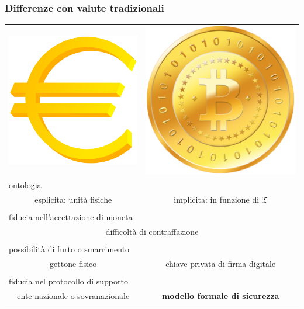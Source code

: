 \begin{frame}
	\frametitle{Differenze con valute tradizionali}
	
\begin{table}[h]
\begin{tabular}{ll}
	\multicolumn{1}{c}{\includegraphics[width = 1 cm]{images/euro.png}} &
	\multicolumn{1}{c}{\includegraphics[width = 1 cm]{images/bitcoin.png}} 											  \\
	
	\multicolumn{2}{l}{{\color{blue}ontologia}}                                                               \\
	\multicolumn{1}{c}{esplicita: unità fisiche} &
	\multicolumn{1}{c}{implicita: in funzione di $\mathfrak{T}$}															  \\ \hline \\
	
	\multicolumn{2}{l}{{\color{blue}fiducia nell'accettazione di moneta}}                                             \\
	\multicolumn{2}{c}{difficoltà di contraffazione}                                                                  \\ \hline \\
	
	\multicolumn{2}{l}{{\color{blue}possibilità di furto o smarrimento}}			\\
	\multicolumn{1}{c}{gettone fisico} & \multicolumn{1}{c}{chiave privata di firma digitale}                         \\ \hline \\
	\multicolumn{2}{l}{{\color{blue}fiducia nel protocollo di supporto}}                                              \\
	\multicolumn{1}{c}{ente nazionale o sovranazionale} & \multicolumn{1}{c}{\textbf{modello formale di sicurezza}}            \\
	\end{tabular}
\end{table}

\end{frame}